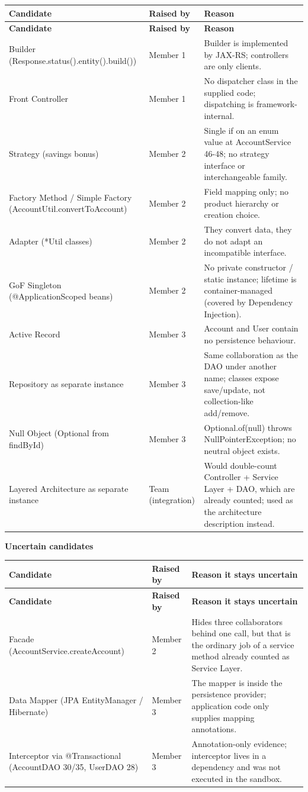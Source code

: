 \documentclass[11pt,a4paper]{article}
\begin{document}
{\small
\begin{longtable}{@{}p{4.6cm}p{2.2cm}p{8.9cm}@{}}
\toprule \textbf{Candidate} & \textbf{Raised by} & \textbf{Reason} \\ \midrule \endfirsthead
\toprule \textbf{Candidate} & \textbf{Raised by} & \textbf{Reason} \\ \midrule \endhead
\bottomrule \endfoot
Builder (Response.status().entity().build()) & Member 1 & Builder is implemented by JAX-RS; controllers are only clients. \\
Front Controller & Member 1 & No dispatcher class in the supplied code; dispatching is framework-internal. \\
Strategy (savings bonus) & Member 2 & Single if on an enum value at AccountService 46-48; no strategy interface or interchangeable family. \\
Factory Method / Simple Factory (AccountUtil.convertToAccount) & Member 2 & Field mapping only; no product hierarchy or creation choice. \\
Adapter (*Util classes) & Member 2 & They convert data, they do not adapt an incompatible interface. \\
GoF Singleton (@ApplicationScoped beans) & Member 2 & No private constructor / static instance; lifetime is container-managed (covered by Dependency Injection). \\
Active Record & Member 3 & Account and User contain no persistence behaviour. \\
Repository as separate instance & Member 3 & Same collaboration as the DAO under another name; classes expose save/update, not collection-like add/remove. \\
Null Object (Optional from findById) & Member 3 & Optional.of(null) throws NullPointerException; no neutral object exists. \\
Layered Architecture as separate instance & Team (integration) & Would double-count Controller + Service Layer + DAO, which are already counted; used as the architecture description instead. \\
\end{longtable}
}
\textbf{Uncertain candidates}
{\small
\begin{longtable}{@{}p{4.6cm}p{2.2cm}p{8.9cm}@{}}
\toprule \textbf{Candidate} & \textbf{Raised by} & \textbf{Reason it stays uncertain} \\ \midrule \endfirsthead
\toprule \textbf{Candidate} & \textbf{Raised by} & \textbf{Reason it stays uncertain} \\ \midrule \endhead
\bottomrule \endfoot
Facade (AccountService.createAccount) & Member 2 & Hides three collaborators behind one call, but that is the ordinary job of a service method already counted as Service Layer. \\
Data Mapper (JPA EntityManager / Hibernate) & Member 3 & The mapper is inside the persistence provider; application code only supplies mapping annotations. \\
Interceptor via @Transactional (AccountDAO 30/35, UserDAO 28) & Member 3 & Annotation-only evidence; interceptor lives in a dependency and was not executed in the sandbox. \\
\end{longtable}
}
\end{document}
